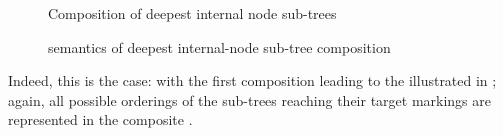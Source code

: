 \begin{figure}[ht]
    \centering
    \caption{Composition of deepest internal node sub-trees}
    \label{fig:compositionOfDeepestInternalSubtrees}
\end{figure}



\begin{figure}[ht]
    \centering
    \caption{\TNFA{} semantics of deepest internal-node sub-tree composition}
    \label{fig:internalNodeComposition}
\end{figure}

Indeed, this is the case: with the first composition leading to the \TNFA{}
illustrated in ; again, all possible
orderings of the sub-trees reaching their target markings are represented in the
composite \TNFA{}.


